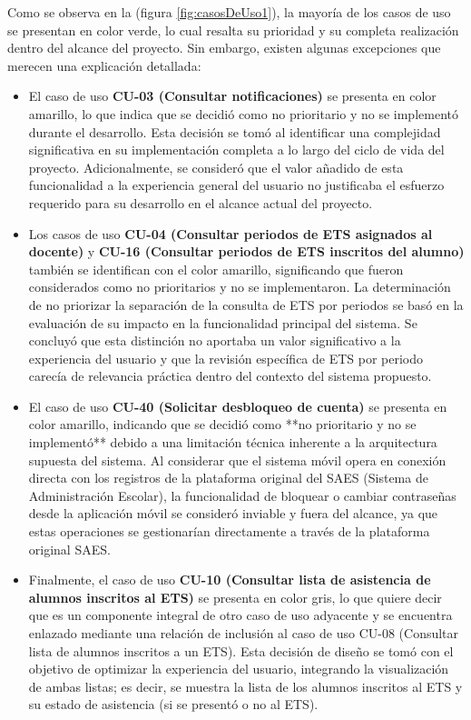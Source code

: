 Como se observa en la (figura \ref{fig:casosDeUso1}), la mayoría de los casos de uso se presentan en color verde, lo cual resalta su prioridad y su completa realización dentro del alcance del proyecto. Sin embargo, existen algunas excepciones que merecen una explicación detallada:

\begin{itemize}
	\item El caso de uso \textbf{CU-03 (Consultar notificaciones)} se presenta en color amarillo, lo que indica que se decidió como no prioritario y no se implementó durante el desarrollo. Esta decisión se tomó al identificar una complejidad significativa en su implementación completa a lo largo del ciclo de vida del proyecto. Adicionalmente, se consideró que el valor añadido de esta funcionalidad a la experiencia general del usuario no justificaba el esfuerzo requerido para su desarrollo en el alcance actual del proyecto.
	
	\item Los casos de uso \textbf{CU-04 (Consultar periodos de ETS asignados al docente)} y \textbf{CU-16 (Consultar periodos de ETS inscritos del alumno)} también se identifican con el color amarillo, significando que fueron considerados como no prioritarios y no se implementaron. La determinación de no priorizar la separación de la consulta de ETS por periodos se basó en la evaluación de su impacto en la funcionalidad principal del sistema. Se concluyó que esta distinción no aportaba un valor significativo a la experiencia del usuario y que la revisión específica de ETS por periodo carecía de relevancia práctica dentro del contexto del sistema propuesto.
	
	\item El caso de uso \textbf{CU-40 (Solicitar desbloqueo de cuenta)} se presenta en color amarillo, indicando que se decidió como **no prioritario y no se implementó** debido a una limitación técnica inherente a la arquitectura supuesta del sistema. Al considerar que el sistema móvil opera en conexión directa con los registros de la plataforma original del SAES (Sistema de Administración Escolar), la funcionalidad de bloquear o cambiar contraseñas desde la aplicación móvil se consideró inviable y fuera del alcance, ya que estas operaciones se gestionarían directamente a través de la plataforma original SAES.
	
	\item Finalmente, el caso de uso \textbf{CU-10 (Consultar lista de asistencia de alumnos inscritos al ETS)} se presenta en color gris, lo que quiere decir que es un componente integral de otro caso de uso adyacente y se encuentra enlazado mediante una relación de inclusión al caso de uso CU-08 (Consultar lista de alumnos inscritos a un ETS). Esta decisión de diseño se tomó con el objetivo de optimizar la experiencia del usuario, integrando la visualización de ambas listas; es decir, se muestra la lista de los alumnos inscritos al ETS y su estado de asistencia (si se presentó o no al ETS).
\end{itemize}

